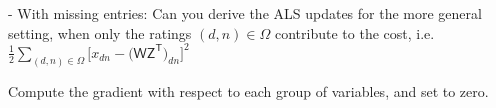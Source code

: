 - With missing entries:
Can you derive the ALS updates for the more general setting, when only the ratings $(d, n) \in \Omega$ contribute to the cost, i.e.
$\frac{1}{2}\sum_{(d,n)\in\Omega}\big[x_{d n}-\big(\mathsf{W Z}^{\mathsf{T}}\big)_{d n}\big]^{2}$

Compute the gradient with respect to each group of variables, and set to zero.


